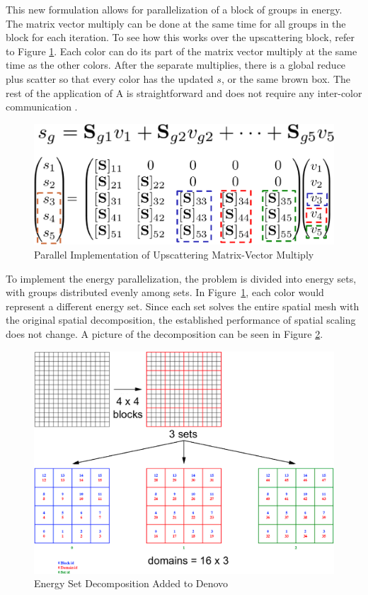 This new formulation allows for parallelization of a block of groups in energy. The matrix vector multiply can be done at the same time for all groups in the block for each iteration. To see how this works over the upscattering block, refer to Figure \ref{fig:KrylovMultiply}. Each color can do its part of the matrix vector multiply at the same time as the other colors. After the separate multiplies, there is a global reduce plus scatter so that every color has the updated $s$, or the same brown box. The rest of the application of A is straightforward and does not require any inter-color communication \cite{Evans2010}.
%
\begin{figure}[!h]
  \begin{center}
    \includegraphics [width=.6\textwidth, height=0.2\textheight ] {KrylovGroupMultiply}
  \end{center}
  \caption{Parallel Implementation of Upscattering Matrix-Vector Multiply}
  \label{fig:KrylovMultiply}
\end{figure}

To implement the energy parallelization, the problem is divided into energy sets, with groups distributed evenly among sets. In Figure~\ref{fig:KrylovMultiply}, each color would represent a different energy set. Since each set solves the entire spatial mesh with the original spatial decomposition, the established performance of spatial scaling does not change. A picture of the decomposition can be seen in Figure \ref{fig:EnergyDecomp}.
%
\begin{figure}[!h]
  \begin{center}
    \includegraphics [width=.8\textwidth, height=0.45\textheight ] {EnergySets}
  \end{center}
  \caption{Energy Set Decomposition Added to Denovo \cite{Evans2011}}
  \label{fig:EnergyDecomp}
\end{figure}

